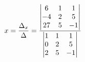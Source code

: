 \documentclass[preview]{standalone}
\begin{document}
\begin{align*}
\special{dvisvgm:raw <g id='unique000'>}x = \frac{\Delta_x}{\Delta} = \frac{\begin{vmatrix} 6 & 1 & 1 \\ -4 & 2 & 5 \\ 27 & 5 & -1 \end{vmatrix}}{\begin{vmatrix} 1 & 1 & 1 \\ 0 & 2 & 5 \\ 2 & 5 & -1 \end{vmatrix}}\special{dvisvgm:raw </g>}
\end{align*}
\end{document}
